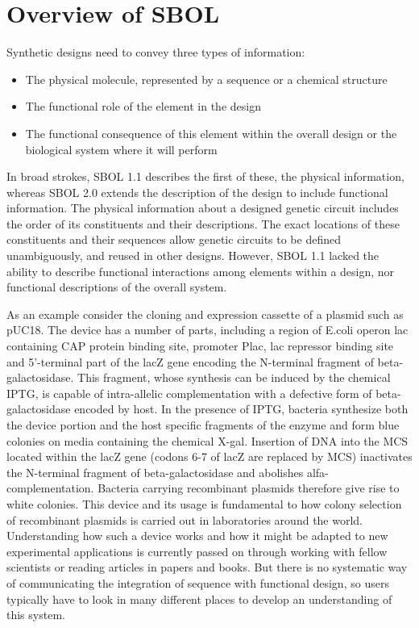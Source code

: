 \section{Overview of SBOL}
Synthetic designs need to convey three types of information:
\begin{itemize}
\item The physical molecule, represented by a sequence or a chemical structure
\item The functional role of the element in the design
\item The functional consequence of this element within the overall design or the biological system where it will perform 
\end{itemize}
In broad strokes, SBOL 1.1 describes the first of these, the physical information, whereas SBOL 2.0 extends the description of the design to include functional information. The physical information about a designed genetic circuit includes the order of its constituents and their descriptions. The exact locations of these constituents and their sequences allow genetic circuits to be defined unambiguously, and reused in other designs. However, SBOL 1.1 lacked the ability to describe functional interactions among elements within a design, nor functional descriptions of the overall system.




As an example consider the cloning and expression cassette of a plasmid such as pUC18. The device has a number of parts, including a region of E.coli operon lac containing CAP protein binding site, promoter Plac, lac repressor binding site and 5’-terminal part of the lacZ gene encoding the N-terminal fragment of beta-galactosidase. This fragment, whose synthesis can be induced by the chemical IPTG, is capable of intra-allelic complementation with a defective form of beta-galactosidase encoded by host. In the presence of IPTG, bacteria synthesize both the device portion and the host specific fragments of the enzyme and form blue colonies on media containing the chemical X-gal. Insertion of DNA into the MCS located within the lacZ gene (codons 6-7 of lacZ are replaced by MCS) inactivates the N-terminal fragment of beta-galactosidase and abolishes alfa-complementation. Bacteria carrying recombinant plasmids therefore give rise to white colonies. This device and its usage is fundamental to how colony selection of recombinant plasmids is carried out in laboratories around the world. Understanding how such a device works and how it might be adapted to new experimental applications is currently passed on through working with fellow scientists or reading articles in papers and books. But there is no systematic way of communicating the integration of sequence with functional design, so users typically have to look in many different places to develop an understanding of this system. 

